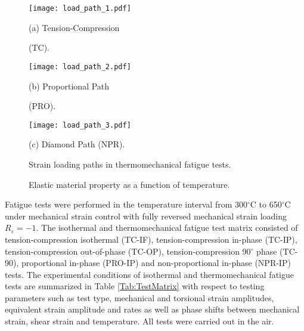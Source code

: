 \documentclass[preprint,5p,twocolumn,11pt,sort&compress]{elsarticle}
\begin{document}
\begin{figure}
  \begin{minipage}[t]{0.5\linewidth}
  \nonumber
    \centering
    \texttt{[image: load\_path\_1.pdf]}
    \centerline{\small (a) Tension-Compression}
    \centerline{\small (TC).}
  \end{minipage}%
  \begin{minipage}[t]{0.5\linewidth}
    \centering
    \texttt{[image: load\_path\_2.pdf]}
    \centerline{\small (b) Proportional Path}
    \centerline{\small (PRO).}
  \end{minipage}
  \centering
  \begin{minipage}[t]{0.5\linewidth}
  \nonumber
    \centering
    \texttt{[image: load\_path\_3.pdf]}
    \centerline{\small (c) Diamond Path (NPR).}
  \end{minipage}%
  \caption{Strain loading paths in thermomechanical fatigue tests.}
  \label{Fig:LoadPath}
\end{figure}

\begin{figure}[!htp]
\caption{Elastic material property as a function of temperature.}
\label{Fig:plot_elastic_by_temperature_in718}
\end{figure}

Fatigue tests were performed in the temperature interval from 300$^\circ$C to 650$^\circ$C under mechanical strain control with fully reversed mechanical strain loading $R_{\varepsilon}=-1$. The isothermal and thermomechanical fatigue test matrix consisted of tension-compression isothermal (TC-IF), tension-compression in-phase (TC-IP), tension-compression out-of-phase (TC-OP), tension-compression 90$^\circ$ phase (TC-90), proportional in-phase (PRO-IP) and non-proportional in-phase (NPR-IP) tests. The experimental conditions of isothermal and thermomechanical fatigue tests are summarized in Table \ref{Tab:TestMatrix} with respect to testing parameters such as test type, mechanical and torsional strain amplitudes, equivalent strain amplitude and rates as well as phase shifts between mechanical strain, shear strain and temperature. All tests were carried out in the air. 
\end{document}

